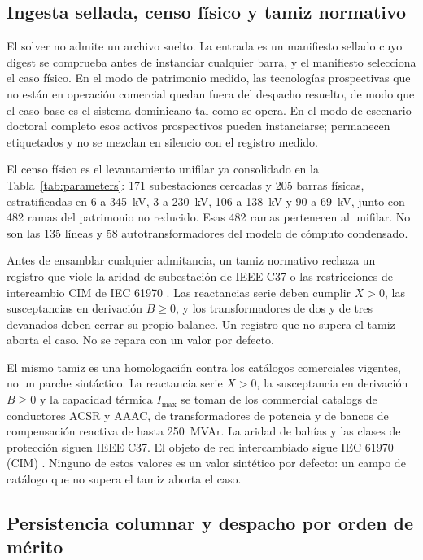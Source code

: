 \subsection{Ingesta sellada, censo físico y tamiz normativo}
\label{sub:intake}

El solver no admite un archivo suelto. La entrada es un manifiesto sellado cuyo digest se comprueba antes de instanciar cualquier barra, y el manifiesto selecciona el caso físico. En el modo de patrimonio medido, las tecnologías prospectivas que no están en operación comercial quedan fuera del despacho resuelto, de modo que el caso base es el sistema dominicano tal como se opera. En el modo de escenario doctoral completo esos activos prospectivos pueden instanciarse; permanecen etiquetados y no se mezclan en silencio con el registro medido.

El censo físico es el levantamiento unifilar ya consolidado en la Tabla~\ref{tab:parameters}: 171 subestaciones cercadas y 205 barras físicas, estratificadas en 6 a 345~kV, 3 a 230~kV, 106 a 138~kV y 90 a 69~kV, junto con 482 ramas del patrimonio no reducido. Esas 482 ramas pertenecen al unifilar. No son las 135 líneas y 58 autotransformadores del modelo de cómputo condensado.

Antes de ensamblar cualquier admitancia, un tamiz normativo rechaza un registro que viole la aridad de subestación de IEEE C37 o las restricciones de intercambio CIM de IEC 61970 \cite{iec61970}. Las reactancias serie deben cumplir $X > 0$, las susceptancias en derivación $B \ge 0$, y los transformadores de dos y de tres devanados deben cerrar su propio balance. Un registro que no supera el tamiz aborta el caso. No se repara con un valor por defecto.

El mismo tamiz es una homologación contra los catálogos comerciales vigentes, no un parche sintáctico. La reactancia serie $X>0$, la susceptancia en derivación $B\ge 0$ y la capacidad térmica $I_{\max}$ se toman de los commercial catalogs de conductores ACSR y AAAC, de transformadores de potencia y de bancos de compensación reactiva de hasta 250~MVAr. La aridad de bahías y las clases de protección siguen IEEE C37. El objeto de red intercambiado sigue IEC 61970 (CIM) \cite{iec61970}. Ninguno de estos valores es un valor sintético por defecto: un campo de catálogo que no supera el tamiz aborta el caso.


\subsection{Persistencia columnar y despacho por orden de mérito}
\label{sub:columnar}

